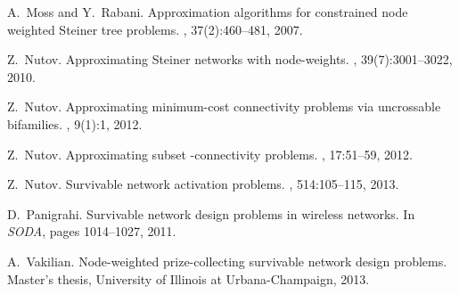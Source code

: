 \documentclass[11pt]{article}
\begin{document}
\begin{thebibliography}{10}
A.~Moss and Y.~Rabani.
\newblock Approximation algorithms for constrained node weighted {S}teiner tree
  problems.
, 37(2):460--481, 2007.

Z.~Nutov.
\newblock Approximating {S}teiner networks with node-weights.
, 39(7):3001--3022, 2010.

Z.~Nutov.
\newblock Approximating minimum-cost connectivity problems via uncrossable
  bifamilies.
, 9(1):1, 2012.

Z.~Nutov.
\newblock Approximating subset -connectivity problems.
, 17:51--59, 2012.

Z.~Nutov.
\newblock Survivable network activation problems.
, 514:105--115, 2013.

D.~Panigrahi.
\newblock Survivable network design problems in wireless networks.
\newblock In {\em SODA}, pages 1014--1027, 2011.

A.~Vakilian.
\newblock Node-weighted prize-collecting survivable network design problems.
\newblock Master's thesis, University of Illinois at Urbana-Champaign, 2013.

\end{thebibliography}
 
\end{document}
